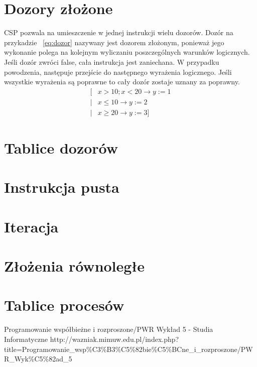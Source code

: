\documentclass[a4paper]{report}
\begin{document}
  \section{Dozory złożone}
  CSP pozwala na umieszczenie w jednej instrukcji wielu dozorów.
  Dozór na przykadzie ~\ref{eq:dozor} nazywany jest dozorem złożonym, ponieważ jego wykonanie polega na kolejnym wyliczaniu poszczególnych warunków logicznych.
  Jeśli dozór zwróci false, cała instrukcja jest zaniechana.
  W przypadku powodzenia, następuje przejście do następnego wyrażenia logicznego.
  Jeśli wszystkie wyrażenia są poprawne to cały dozór zostaje uznany za poprawny.
  \begin{equation}
    \label{eq:dozor}
    \begin{split}
      \lbrack & x > 10; x < 20 \rightarrow y := 1\\
      | & x \leq 10 \rightarrow y := 2\\
      | & x \geq 20 \rightarrow y := 3 \rbrack
    \end{split}
  \end{equation}

  \section{Tablice dozorów}

  \section{Instrukcja pusta}

  \section{Iteracja}

  \section{Złożenia równoległe}

  \section{Tablice procesów}

  \begin{thebibliography}{9}
     Programowanie współbieżne i rozproszone/PWR Wykład 5 - Studia Informatyczne http://wazniak.mimuw.edu.pl/index.php?title=Programowanie\_wsp\%C3\%B3\%C5\%82bie\%C5\%BCne\_i\_rozproszone/PWR\_Wyk\%C5\%82ad\_5\\
  \end{thebibliography}
\end{document}
